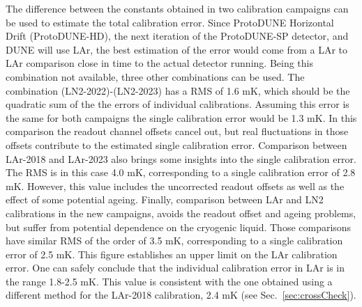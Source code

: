 \noindent The difference between the constants obtained in two calibration campaigns can be used to estimate the total calibration error. Since ProtoDUNE Horizontal Drift (ProtoDUNE-HD), the next iteration of the ProtoDUNE-SP detector, and DUNE will use LAr, the best estimation of the error would come from a LAr to LAr comparison close in time to the actual detector running. Being this combination not available, three other combinations can be used. The combination (LN2-2022)-(LN2-2023) has a RMS of 1.6 mK, which should be the quadratic sum of the the errors of individual calibrations. Assuming this error is the same for both campaigns the single calibration error would be 1.3 mK. In this comparison the readout channel offsets cancel out, but real fluctuations in those offsets contribute to the estimated single calibration error. Comparison between LAr-2018 and LAr-2023 also brings some insights into the single calibration error. The RMS is in this case 4.0 mK, corresponding to a single calibration error of 2.8 mK. However, this value includes the uncorrected readout offsets as well as the effect of some potential ageing. Finally, comparison between LAr and LN2 calibrations in the new campaigns, avoids the readout offset and ageing problems, but suffer from potential dependence on the cryogenic liquid. Those comparisons have similar RMS of the order of 3.5 mK, corresponding to a single calibration error of 2.5 mK. This figure establishes an upper limit on the LAr calibration error. One can safely conclude that the individual calibration error in LAr is in the range 1.8-2.5 mK. This value is consistent with the one obtained using a different method for the LAr-2018 calibration, 2.4 mK (see Sec.~\ref{sec:crossCheck}).
